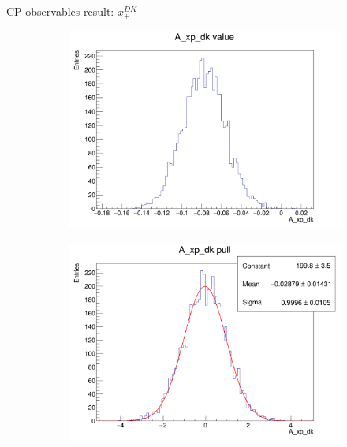 \documentclass{beamer}
\begin{document}
\begin{frame}{CP observables result: $x_+^{DK}$}
  \begin{figure}
    \centering
    \begin{subfigure}{0.42\textwidth}
      \includegraphics[width = 1.0\textwidth]{Plots/A_xp_dk_value.png}
    \end{subfigure}
    \begin{subfigure}{0.42\textwidth}
      \includegraphics[width = 1.0\textwidth]{Plots/A_xp_dk_pull.png}
    \end{subfigure}%
    \begin{subfigure}{0.42\textwidth}

\end{subfigure}
\end{figure}
\end{frame}
\end{document}
